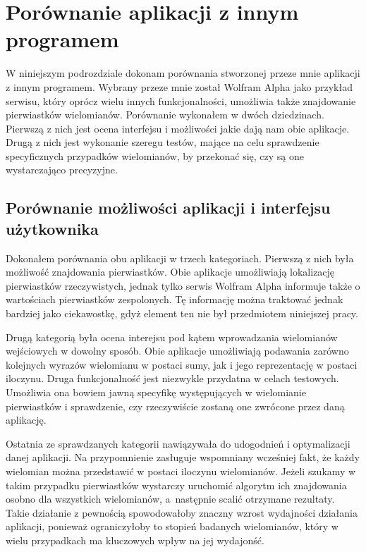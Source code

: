 \section {Porównanie aplikacji z innym programem}

W niniejszym podrozdziale dokonam porównania stworzonej przeze mnie aplikacji z innym programem. Wybrany przeze mnie został Wolfram Alpha jako przykład serwisu, który oprócz wielu innych funkcjonalności, umożliwia także znajdowanie pierwiastków wielomianów. Porównanie wykonałem w dwóch dziedzinach. Pierwszą z nich jest ocena interfejsu i możliwości jakie dają nam obie aplikacje. Drugą z nich jest wykonanie szeregu testów, mające na celu sprawdzenie specyficznych przypadków wielomianów, by przekonać się, czy są one wystarczająco precyzyjne.

\subsection {Porównanie możliwości aplikacji i interfejsu użytkownika}

Dokonałem porównania obu aplikacji w trzech kategoriach. Pierwszą z nich była możliwość znajdowania pierwiastków. Obie aplikacje umożliwiają lokalizację pierwiastków rzeczywistych, jednak tylko serwis Wolfram Alpha informuje także o wartościach pierwiastków zespolonych. Tę informację można traktować jednak bardziej jako ciekawostkę, gdyż element ten nie był przedmiotem niniejszej pracy.

Drugą kategorią była ocena interejsu pod kątem wprowadzania wielomianów wejściowych w dowolny sposób. Obie aplikacje umożliwiają podawania zarówno kolejnych wyrazów wielomianu w postaci sumy, jak i jego reprezentację w postaci iloczynu. Druga funkcjonalność jest niezwykle przydatna w celach testowych. Umożliwia ona bowiem jawną specyfikę występujących w wielomianie pierwiastków i sprawdzenie, czy rzeczywiście zostaną one zwrócone przez daną aplikację.

Ostatnia ze sprawdzanych kategorii nawiązywała do udogodnień i optymalizacji danej aplikacji. Na przypomnienie zasługuje wspomniany wcześniej fakt, że każdy wielomian można przedstawić w postaci iloczynu wielomianów. Jeżeli szukamy w takim przypadku pierwiastków wystarczy uruchomić algorytm ich znajdowania osobno dla wszystkich wielomianów, a~następnie scalić otrzymane rezultaty. Takie działanie z pewnością spowodowałoby znaczny wzrost wydajności działania aplikacji, ponieważ ograniczyłoby to stopień badanych wielomianów, który w wielu przypadkach ma kluczowych wpływ na jej wydajonść.

